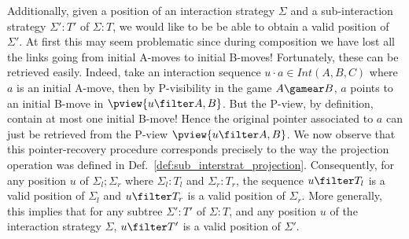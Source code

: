 Additionally, given a position of an interaction strategy $\Sigma$ and a sub-interaction strategy $\Sigma':T'$ of $\Sigma:T$,
we would like to be be able to obtain a valid position of $\Sigma'$.
At first this may seem problematic since during composition we have lost all the links going from initial A-moves to initial B-moves!
Fortunately, these can be retrieved easily. Indeed, take an interaction sequence $u \cdot a \in Int(A,B,C)$ where $a$ is an initial A-move,
then by P-visibility in the game $A\gamear B$, $a$ points to an initial B-move in $\pview{u\filter A,B}$. But the P-view, by definition, contain at most one initial B-move! Hence the original pointer associated to $a$ can just be retrieved from the P-view $\pview{u\filter A,B}$.
We now observe that this pointer-recovery procedure corresponds precisely to the way the projection operation was defined in Def.\ \ref{def:sub_interstrat_projection}. Consequently, for any position $u$ of $\Sigma_l ; \Sigma_r$ where $\Sigma_l:T_l$ and $\Sigma_r:T_r$,
the sequence $u\filter T_l$ is a valid position of $\Sigma_l$ and $u\filter T_r$ is a valid position of $\Sigma_r$.
More generally, this implies that for any subtree $\Sigma':T'$ of $\Sigma:T$, and any position $u$ of the interaction strategy $\Sigma$, $u\filter T'$ is a valid position of $\Sigma'$.


